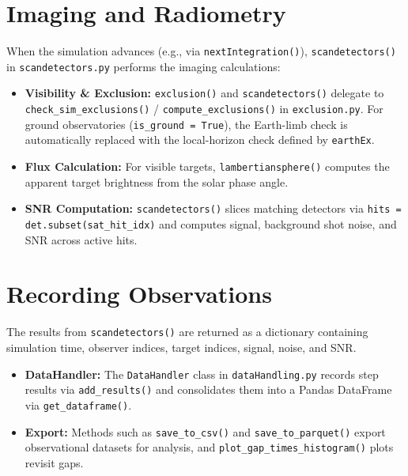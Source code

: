 \documentclass{article}
\begin{document}
\section{Imaging and Radiometry}
When the simulation advances (e.g., via \texttt{nextIntegration()}), \texttt{scandetectors()} in
\texttt{scandetectors.py} performs the imaging calculations:
\begin{itemize}
    \item \textbf{Visibility \& Exclusion:} \texttt{exclusion()} and \texttt{scandetectors()}
    delegate to \texttt{check\_sim\_exclusions()} / \texttt{compute\_exclusions()} in
    \texttt{exclusion.py}. For ground observatories (\texttt{is\_ground = True}), the Earth-limb
    check is automatically replaced with the local-horizon check defined by \texttt{earthEx}.
    \item \textbf{Flux Calculation:} For visible targets, \texttt{lambertiansphere()} computes the
    apparent target brightness from the solar phase angle.
    \item \textbf{SNR Computation:} \texttt{scandetectors()} slices matching detectors via
    \texttt{hits = det.subset(sat\_hit\_idx)} and computes signal, background shot noise, and
    SNR across active hits.
\end{itemize}

\section{Recording Observations}
The results from \texttt{scandetectors()} are returned as a dictionary containing simulation time,
observer indices, target indices, signal, noise, and SNR.
\begin{itemize}
    \item \textbf{DataHandler:} The \texttt{DataHandler} class in \texttt{dataHandling.py} records
    step results via \texttt{add\_results()} and consolidates them into a Pandas DataFrame via
    \texttt{get\_dataframe()}.
    \item \textbf{Export:} Methods such as \texttt{save\_to\_csv()} and \texttt{save\_to\_parquet()}
    export observational datasets for analysis, and \texttt{plot\_gap\_times\_histogram()} plots
    revisit gaps.
\end{itemize}
\end{document}
